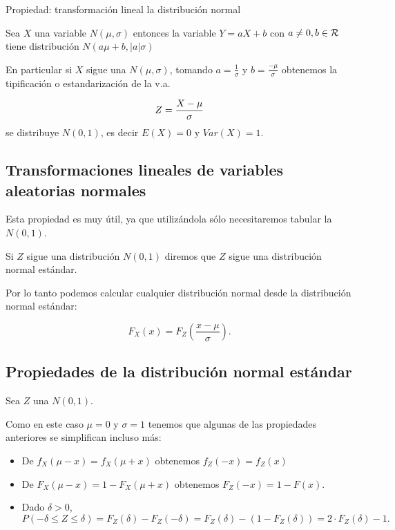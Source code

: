 \documentclass[]{book}
\providecommand{\tightlist}{%
  \setlength{\itemsep}{0pt}\setlength{\parskip}{0pt}}
\begin{document}
 Propiedad: transformación lineal la distribución normal

Sea \(X\) una variable \(N(\mu,\sigma)\) entonces la variable \(Y=a X+b\) con
\(a\not=0,b\in\cal{R}\) tiene distribución \(N(a\mu+b, |a| \sigma)\)

En particular si \(X\) sigue una \(N(\mu,\sigma)\), tomando \(a=\frac1{\sigma}\) y \(b= \frac{-\mu}{\sigma}\) obtenemos la tipificación o estandarización de la v.a.

\[Z={{X-\mu}\over {\sigma}}\]
se distribuye \(N(0,1)\), es decir \(E(X)=0\) y \(Var(X)=1\).

\hypertarget{transformaciones-lineales-de-variables-aleatorias-normales-1}{%
\subsection{Transformaciones lineales de variables aleatorias normales}\label{transformaciones-lineales-de-variables-aleatorias-normales-1}}

Esta propiedad es muy útil, ya que utilizándola sólo necesitaremos tabular la
\(N(0,1)\).

Si \(Z\) sigue una distribución \(N(0,1)\) diremos que \(Z\) sigue una distribución normal estándar.

Por lo tanto podemos calcular cualquier distribución normal desde la distribución normal estándar:

\[
F_X(x)=F_Z \left(\frac{x-\mu}{\sigma}\right).
\]

\hypertarget{propiedades-de-la-distribuciuxf3n-normal-estuxe1ndar}{%
\subsection{Propiedades de la distribución normal estándar}\label{propiedades-de-la-distribuciuxf3n-normal-estuxe1ndar}}

Sea \(Z\) una \(N(0,1)\).

Como en este caso \(\mu=0\) y \(\sigma=1\) tenemos que algunas de las propiedades anteriores se simplifican incluso más:

\begin{itemize}
\tightlist
\item
  De \(f_X(\mu-x)=f_X(\mu+x)\) obtenemos \(f_Z(-x)=f_Z(x)\)
\item
  De \(F_X(\mu-x)=1-F_X(\mu+x)\) obtenemos \(F_Z(-x)=1-F(x).\)
\item
  Dado \(\delta>0\),
  \[
  P(-\delta\leq Z \leq \delta)=F_{Z}(\delta)-F_{Z}(-\delta)=F_Z(\delta)-(1-F_Z(\delta))=
  2\cdot F_Z(\delta)-1.
  \]
\end{itemize}
\end{document}
